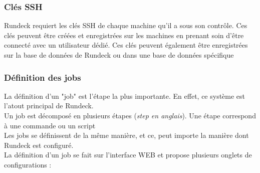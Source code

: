\documentclass[12pt]{article}
\begin{document}

\subsubsection{Clés SSH}
Rundeck requiert les clés SSH de chaque machine qu'il a sous son contrôle. Ces clés peuvent être créées et enregistrées sur les machines en prenant soin d'être connecté avec un utilisateur dédié. Ces clés peuvent également être enregistrées sur la base de données de Rundeck ou dans une base de données spécifique

\subsubsection{Définition des jobs}
La définition d'un "job" est l'étape la plus importante. En effet, ce système est l'atout principal de Rundeck.
\\
Un job est décomposé en plusieurs étapes (\textit{step en anglais}). Une étape correspond à une commande ou un script
\\
Les jobs se définissent de la même manière, et ce, peut importe la manière dont Rundeck est configuré.
\\
La définition d'un job se fait sur l'interface WEB et propose plusieurs onglets de configurations :
\end{document}
